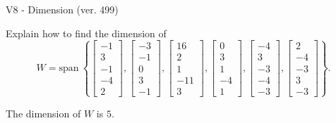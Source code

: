 \begin{exercise}
  \begin{exerciseTitle}V8 - Dimension (ver. 499)\end{exerciseTitle}
  \begin{exerciseStatement}
    Explain how to find the dimension of 
\[W=\mathrm{span}\ \left\{\left[\begin{array}{r}
-1 \\
3 \\
-1 \\
-4 \\
2
\end{array}\right] , \left[\begin{array}{r}
-3 \\
-1 \\
0 \\
3 \\
-1
\end{array}\right] , \left[\begin{array}{r}
16 \\
2 \\
1 \\
-11 \\
3
\end{array}\right] , \left[\begin{array}{r}
0 \\
3 \\
1 \\
-4 \\
1
\end{array}\right] , \left[\begin{array}{r}
-4 \\
3 \\
-3 \\
-4 \\
-3
\end{array}\right] , \left[\begin{array}{r}
2 \\
-4 \\
-3 \\
3 \\
-3
\end{array}\right]\right\}.\]



  \end{exerciseStatement}
  \begin{exerciseAnswer}
   The dimension of \(W\) is  \(5\).
  


  \end{exerciseAnswer}
\end{exercise}